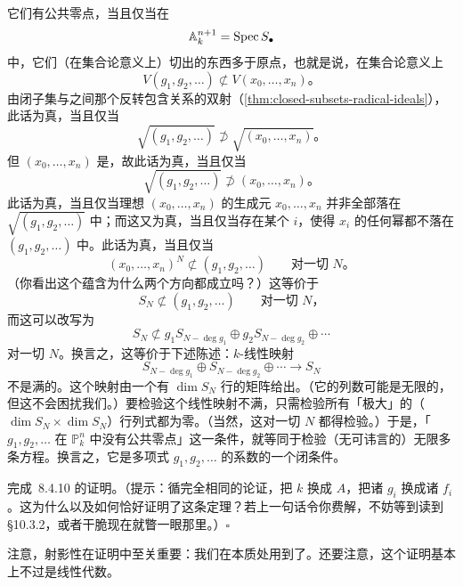 它们有公共零点，当且仅当在
\[
\mathbb{A}^{n+1}_k=\operatorname{Spec} S_\bullet
\]
中，它们（在集合论意义上）切出的东西多于原点，也就是说，在集合论意义上
\[
V(g_1,g_2,\dots)\not\subset V(x_0,\dots,x_n)\text{。}
\]
由闭子集与\trRadicalIdeal{}之间那个反转包含关系的双射（\cref{thm:closed-subsets-radical-ideals}），此话为真，当且仅当
\[
\sqrt{(g_1,g_2,\dots)}\not\supset\sqrt{(x_0,\dots,x_n)}\text{。}
\]
但 $(x_0,\dots,x_n)$ 是\trRadical，故此话为真，当且仅当
\[
\sqrt{(g_1,g_2,\dots)}\not\supset(x_0,\dots,x_n)\text{。}
\]
此话为真，当且仅当理想 $(x_0,\dots,x_n)$ 的生成元 $x_0,\dots,x_n$ 并非全部落在 $\sqrt{(g_1,g_2,\dots)}$ 中；而这又为真，当且仅当存在某个 $i$，使得 $x_i$ 的任何幂都不落在 $(g_1,g_2,\dots)$ 中。此话为真，当且仅当
\[
(x_0,\dots,x_n)^N\not\subset(g_1,g_2,\dots)\qquad\text{对一切 }N\text{。}
\]
（你看出这个蕴含为什么两个方向都成立吗？）这等价于
\[
S_N\not\subset(g_1,g_2,\dots)\qquad\text{对一切 }N\text{，}
\]
而这可以改写为
\begin{equation*}\tag{8.4.11.1}\label{eq:elimination-graded-map}
S_N\not\subset g_1S_{N-\deg g_1}\oplus g_2S_{N-\deg g_2}\oplus\cdots
\end{equation*}
对一切 $N$。换言之，这等价于下述陈述：$k$-线性映射
\[
S_{N-\deg g_1}\oplus S_{N-\deg g_2}\oplus\cdots\longrightarrow S_N
\]
不是满的。这个映射由一个有 $\dim S_N$ 行的矩阵给出。（它的列数可能是无限的，但这不会困扰我们。）要检验这个线性映射不满，只需检验所有「极大」的（$\dim S_N\times\dim S_N$）行列式都为零。（当然，这对一切 $N$ 都得检验。）于是，「$g_1,g_2,\dots$ 在 $\mathbb{P}^n_k$ 中没有公共零点」这一条件，就等同于检验（无可讳言的）无限多条方程。换言之，它是多项式 $g_1,g_2,\dots$ 的系数的一个\trZariski{}闭条件。

\begin{exercise}\label{ex:ftet-completion}
完成\trFundamentalTheoremOfEliminationTheory{}~8.4.10 的证明。（提示：循完全相同的论证，把 $k$ 换成 $A$，把诸 $g_i$ 换成诸 $f_i$。这为什么以及如何恰好证明了这条定理？若上一句话令你费解，不妨等到读到\S10.3.2，或者干脆现在就瞥一眼那里。）\hfill$\square$
\end{exercise}

注意，射影性在证明中至关重要：我们在本质处用到了\trGradedRing。还要注意，这个证明基本上不过是线性代数。
